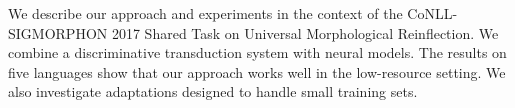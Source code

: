 We describe our approach and experiments in the context of the CoNLL-SIGMORPHON 2017 Shared Task on Universal Morphological Reinflection. We combine a discriminative transduction system with neural models. The results on five languages show that our approach works well in the low-resource setting. We also investigate adaptations designed to handle small training sets.
